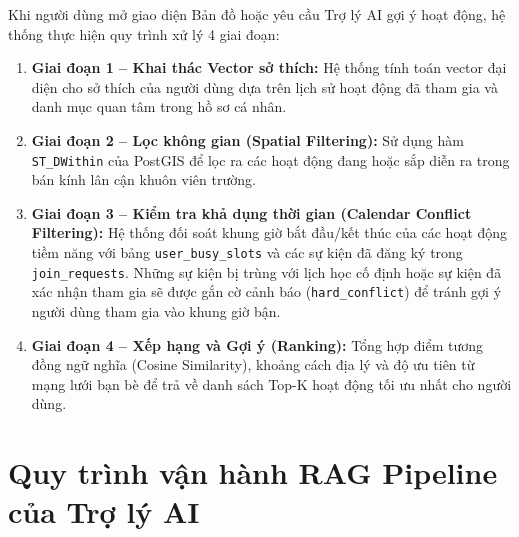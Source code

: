 Khi người dùng mở giao diện Bản đồ hoặc yêu cầu Trợ lý AI gợi ý hoạt động, hệ thống thực hiện quy trình xử lý 4 giai đoạn:
\begin{enumerate}
    \item \textbf{Giai đoạn 1 -- Khai thác Vector sở thích:} Hệ thống tính toán vector đại diện cho sở thích của người dùng dựa trên lịch sử hoạt động đã tham gia và danh mục quan tâm trong hồ sơ cá nhân.
    
    \item \textbf{Giai đoạn 2 -- Lọc không gian (Spatial Filtering):} Sử dụng hàm \texttt{ST\_DWithin} của PostGIS để lọc ra các hoạt động đang hoặc sắp diễn ra trong bán kính lân cận khuôn viên trường.

    \item \textbf{Giai đoạn 3 -- Kiểm tra khả dụng thời gian (Calendar Conflict Filtering):} Hệ thống đối soát khung giờ bắt đầu/kết thúc của các hoạt động tiềm năng với bảng \texttt{user\_busy\_slots} và các sự kiện đã đăng ký trong \texttt{join\_requests}. Những sự kiện bị trùng với lịch học cố định hoặc sự kiện đã xác nhận tham gia sẽ được gắn cờ cảnh báo (\texttt{hard\_conflict}) để tránh gợi ý người dùng tham gia vào khung giờ bận.

    \item \textbf{Giai đoạn 4 -- Xếp hạng và Gợi ý (Ranking):} Tổng hợp điểm tương đồng ngữ nghĩa (Cosine Similarity), khoảng cách địa lý và độ ưu tiên từ mạng lưới bạn bè để trả về danh sách Top-K hoạt động tối ưu nhất cho người dùng.
\end{enumerate}

\section{Quy trình vận hành RAG Pipeline của Trợ lý AI}

